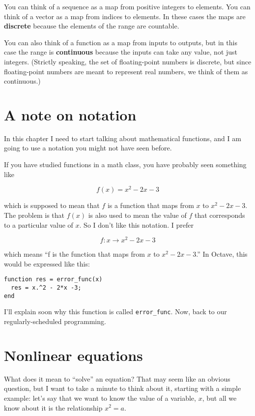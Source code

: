 You can think of a sequence as a map from positive integers
to elements. You can think of a vector
as a map from indices to elements. In these cases the maps
are {\bf discrete} because the elements of the range are countable.

You can also think of a function as a map from inputs to outputs, but
in this case the range is {\bf continuous} because the inputs can take
any value, not just integers. (Strictly speaking, the set of
floating-point numbers is discrete, but since floating-point numbers
are meant to represent real numbers, we think of them as continuous.)


\section{A note on notation}
\label{notation}

In this chapter I need to start talking about mathematical
functions, and I am going to use a notation you might not have
seen before.

If you have studied functions in a math class, you have probably
seen something like

\[ f(x) = x^2 - 2x -3 \]

which is supposed to mean that $f$ is a function that maps from
$x$ to $x^2 - 2x -3$. The problem is that $f(x)$ is also used to mean
the value of $f$ that corresponds to a particular value of $x$. So I
don't like this notation. I prefer

\[ f : x \to x^2 - 2x -3 \]

which means ``f is the function that maps from
$x$ to $x^2 - 2x -3$.'' In Octave, this would be expressed
like this:

\begin{verbatim}
function res = error_func(x)
  res = x.^2 - 2*x -3;
end
\end{verbatim}

I'll explain soon why this function is called {\tt error\_func}.
Now, back to our regularly-scheduled programming.



\section{Nonlinear equations}

What does it mean to ``solve'' an equation? That may seem like an
obvious question, but I want to take a minute to think about it,
starting with a simple example: let's say that we want to know the
value of a variable, $x$, but all we know about it is the relationship
$x^2 = a$.

